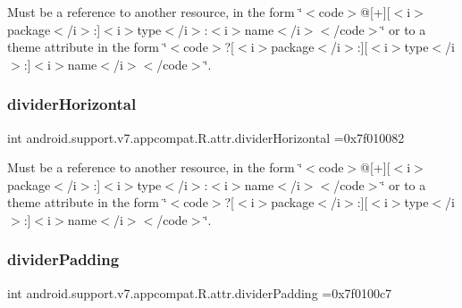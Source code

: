 Must be a reference to another resource, in the form \char`\"{}$<$code$>$@\mbox{[}+\mbox{]}\mbox{[}$<$i$>$package$<$/i$>$\+:\mbox{]}$<$i$>$type$<$/i$>$\+:$<$i$>$name$<$/i$>$$<$/code$>$\char`\"{} or to a theme attribute in the form \char`\"{}$<$code$>$?\mbox{[}$<$i$>$package$<$/i$>$\+:\mbox{]}\mbox{[}$<$i$>$type$<$/i$>$\+:\mbox{]}$<$i$>$name$<$/i$>$$<$/code$>$\char`\"{}. \mbox{\label{classandroid_1_1support_1_1v7_1_1appcompat_1_1R_1_1attr_a447c1b9600c69124b589aa4532867757}} 
\subsubsection{\texorpdfstring{divider\+Horizontal}{dividerHorizontal}}
{\footnotesize\ttfamily int android.\+support.\+v7.\+appcompat.\+R.\+attr.\+divider\+Horizontal =0x7f010082\hspace{0.3cm}{\ttfamily [static]}}

Must be a reference to another resource, in the form \char`\"{}$<$code$>$@\mbox{[}+\mbox{]}\mbox{[}$<$i$>$package$<$/i$>$\+:\mbox{]}$<$i$>$type$<$/i$>$\+:$<$i$>$name$<$/i$>$$<$/code$>$\char`\"{} or to a theme attribute in the form \char`\"{}$<$code$>$?\mbox{[}$<$i$>$package$<$/i$>$\+:\mbox{]}\mbox{[}$<$i$>$type$<$/i$>$\+:\mbox{]}$<$i$>$name$<$/i$>$$<$/code$>$\char`\"{}. \mbox{\label{classandroid_1_1support_1_1v7_1_1appcompat_1_1R_1_1attr_a8e3b4563691b41794d6024946fd26078}} 
\subsubsection{\texorpdfstring{divider\+Padding}{dividerPadding}}
{\footnotesize\ttfamily int android.\+support.\+v7.\+appcompat.\+R.\+attr.\+divider\+Padding =0x7f0100c7\hspace{0.3cm}{\ttfamily [static]}}

